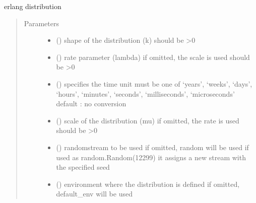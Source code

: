 \documentclass[letterpaper,10pt,english]{sphinxmanual}
\begin{document}
\begin{fulllineitems}
\label{\detokenize{Reference:salabim.Erlang}}
erlang distribution
\begin{quote}\begin{description}
\item[{Parameters}] \leavevmode\begin{itemize}
\item {} 
 () \textendash{} shape of the distribution (k) 
should be \textgreater{}0

\item {} 
 () \textendash{} rate parameter (lambda) 
if omitted, the scale is used 
should be \textgreater{}0

\item {} 
 () \textendash{} specifies the time unit 
must be one of ‘years’, ‘weeks’, ‘days’, ‘hours’, ‘minutes’, ‘seconds’, ‘milliseconds’, ‘microseconds’ 
default : no conversion 

\item {} 
 () \textendash{} scale of the distribution (mu) 
if omitted, the rate is used 
should be \textgreater{}0

\item {} 
 () \textendash{} randomstream to be used 
if omitted, random will be used 
if used as random.Random(12299)
it assigns a new stream with the specified seed

\item {} 
 ({\hyperref[\detokenize{Reference:salabim.Environment}]{}}) \textendash{} environment where the distribution is defined 
if omitted, default\_env will be used

\end{itemize}


\end{description}
\end{quote}
\end{fulllineitems}
\end{document}
